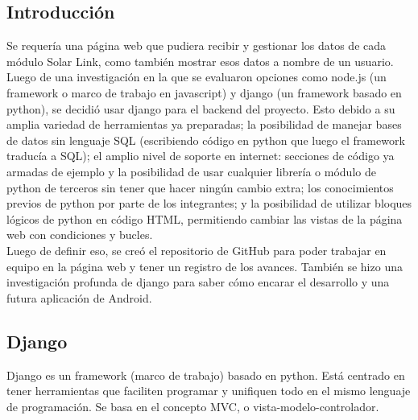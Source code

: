 \subsection{Introducción}

Se requería una página web que pudiera recibir y gestionar los datos de cada módulo Solar Link, como también mostrar esos datos a nombre de un usuario. \\

Luego de una investigación en la que se evaluaron opciones como node.js (un framework o marco de trabajo en javascript) y django (un framework basado en python), se decidió usar django para el backend del proyecto. Esto debido a su amplia variedad de herramientas ya preparadas; la posibilidad de manejar bases de datos sin lenguaje SQL (escribiendo código en python que luego el framework traducía a SQL); el amplio nivel de soporte en internet: secciones de código ya armadas de ejemplo y la posibilidad de usar cualquier librería o módulo de python de terceros sin tener que hacer ningún cambio extra; los conocimientos previos de python por parte de los integrantes; y la posibilidad de utilizar bloques lógicos de python en código HTML, permitiendo cambiar las vistas de la página web con condiciones y bucles.\\

Luego de definir eso, se creó el repositorio de GitHub para poder trabajar en equipo en la página web y tener un registro de los avances. También se hizo una investigación profunda de django para saber cómo encarar el desarrollo y una futura aplicación de Android.\\


\subsection{Django}
Django es un framework (marco de trabajo) basado en python. Está centrado en tener herramientas que faciliten programar y unifiquen todo en el mismo lenguaje de programación. Se basa en el concepto MVC, o vista-modelo-controlador.\\

